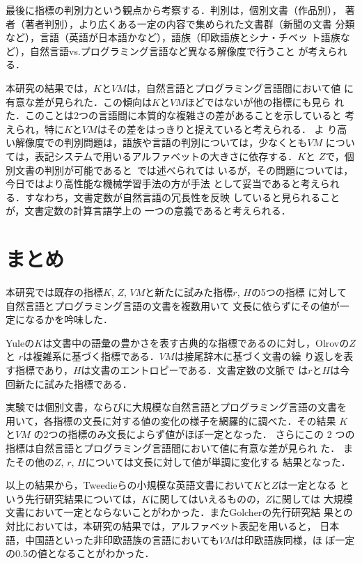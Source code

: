 \documentclass[japanese]{jnlp_JS2.0}
\begin{document}
最後に指標の判別力という観点から考察する．判別は，個別文書（作品別），
著者（著者判別），より広くある一定の内容で集められた文書群（新聞の文書
  分類など），言語（英語が日本語かなど），語族（印欧語族とシナ・チベッ
  ト語族など），自然言語vs.プログラミング言語など異なる解像度で行うこと
が考えられる．

本研究の結果では，$K$と$\mathit{VM}$は，自然言語とプログラミング言語間において値
に有意な差が見られた．この傾向は$K$と$\mathit{VM}$ほどではないが他の指標にも見ら
れた．このことは2つの言語間に本質的な複雑さの差があることを示していると
考えられ，特に$K$と$\mathit{VM}$はその差をはっきりと捉えていると考えられる． よ
り高い解像度での判別問題は，語族や言語の判別については，少なくとも$\mathit{VM}$
については，表記システムで用いるアルファベットの大きさに依存する．$K$と
$Z$で，個別文書の判別が可能であると~\cite{BaayenTweedie}では述べられては
いるが，その問題については，今日ではより高性能な機械学習手法の方が手法
として妥当であると考えられる．すなわち，文書定数が自然言語の冗長性を反映
していると見られることが，文書定数の計算言語学上の
一つの意義であると考えられる．



\section{まとめ}

本研究では既存の指標$K$, $Z$, $\mathit{VM}$と新たに試みた指標$r$, $H$の5つの指標
に対して自然言語とプログラミング言語の文書を複数用いて
文長に依らずにその値が一定になるかを吟味した．

Yuleの$K$は文書中の語彙の豊かさを表す古典的な指標であるのに対し，Olrovの$Z$と
$r$は複雑系に基づく指標である．$\mathit{VM}$は接尾辞木に基づく文書の繰
り返しを表す指標であり，$H$は文書のエントロピーである．文書定数の文脈で
は$r$と$H$は今回新たに試みた指標である．

実験では個別文書，ならびに大規模な自然言語とプログラミング言語の文書を
用いて，各指標の文長に対する値の変化の様子を網羅的に調べた．その結果
$K$と$\mathit{VM}$ の2つの指標のみ文長によらず値がほぼ一定となった． さらにこの
2 つの指標は自然言語とプログラミング言語間において値に有意な差が見られ
た． またその他の$Z$, $r$, $H$については文長に対して値が単調に変化する
結果となった．


以上の結果から，Tweedieらの小規模な英語文書において$K$と$Z$は一定となる
という先行研究結果については，$K$に関してはいえるものの，$Z$に関しては
大規模文書において一定とならないことがわかった．またGolcherの先行研究結
果との対比においては，本研究の結果では，アルファベット表記を用いると，
日本語，中国語といった非印欧語族の言語においても$\mathit{VM}$は印欧語族同様，ほ
ぼ一定の0.5の値となることがわかった．
\end{document}
